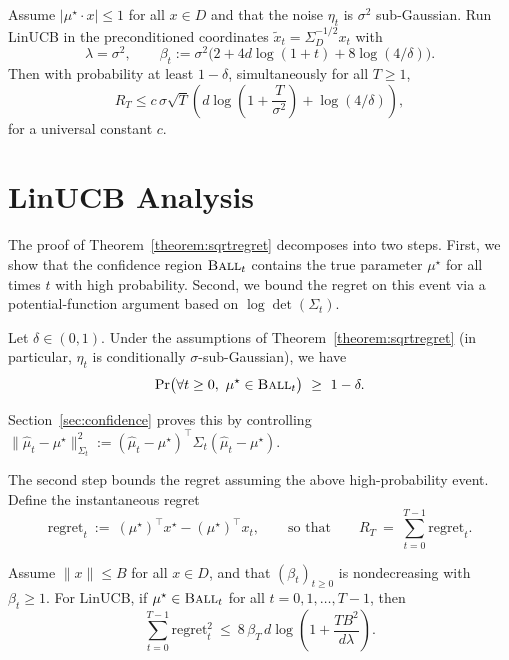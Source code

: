 \begin{corollary}\label{cor:linucb_precond}
Assume $|\mu^\star\cdot x|\le 1$ for all $x\in D$ and that the noise $\eta_t$ is
$\sigma^2$ sub-Gaussian. Run LinUCB in the preconditioned coordinates
$\tilde x_t=\Sigma_D^{-1/2}x_t$ with
\[
\lambda=\sigma^2,
\qquad
\beta_t := \sigma^2\Big(2 + 4d\log(1+t) + 8\log(4/\delta)\Big).
\]
Then with probability at least $1-\delta$, simultaneously for all $T\ge 1$,
\[
R_T \le c\,\sigma\sqrt{T}\left(d\log\!\left(1+\frac{T}{\sigma^2}\right)+\log(4/\delta)\right),
\]
for a universal constant $c$.
\end{corollary}


\section{LinUCB Analysis}

The proof of Theorem~\ref{theorem:sqrtregret} decomposes into two steps.  First,
we show that the confidence region $\textsc{Ball}_t$ contains the true parameter
$\mu^\star$ for all times $t$ with high probability.  Second, we bound the regret
on this event via a potential-function argument based on $\log\det(\Sigma_t)$.

\begin{proposition}[Confidence]\label{proposition:confidence}
Let $\delta\in(0,1)$. Under the assumptions of Theorem~\ref{theorem:sqrtregret}
(in particular, $\eta_t$ is conditionally $\sigma$-sub-Gaussian), we have
\[
\Pr\!\big(\forall t\ge 0,\ \mu^\star\in \textsc{Ball}_t\big)\ \ge\ 1-\delta.
\]
\end{proposition}

Section~\ref{sec:confidence} proves this by controlling
$\|\widehat{\mu}_t-\mu^\star\|^2_{\Sigma_t}
:=(\widehat{\mu}_t-\mu^\star)^\top \Sigma_t(\widehat{\mu}_t-\mu^\star)$.

\medskip

The second step bounds the regret assuming the above high-probability event.
Define the instantaneous regret
\[
\mathrm{regret}_t \ :=\ (\mu^\star)^\top x^\star - (\mu^\star)^\top x_t,
\qquad\text{so that}\qquad
R_T\ =\ \sum_{t=0}^{T-1}\mathrm{regret}_t.
\]

\begin{proposition}\label{proposition:l2regretbd}
Assume $\|x\|\le B$ for all $x\in D$, and that $(\beta_t)_{t\ge 0}$ is
nondecreasing with $\beta_t\ge 1$.  For LinUCB, if
$\mu^\star\in \textsc{Ball}_t$ for all $t=0,1,\dots,T-1$, then
\[
\sum_{t=0}^{T-1} \mathrm{regret}_t^2
\ \le\
8\,\beta_T\, d \log\!\left(1+\frac{TB^2}{d\lambda}\right).
\]
\end{proposition}

